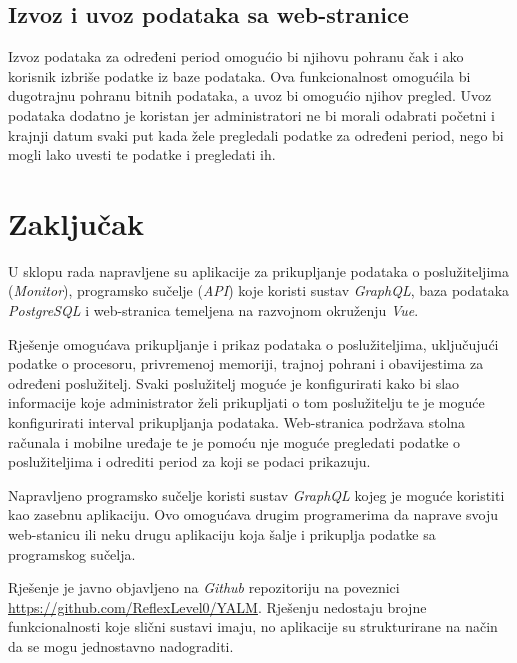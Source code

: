 \documentclass[zavrsnirad]{fer}
\begin{document}
\section{Izvoz i uvoz podataka sa web-stranice}
Izvoz podataka za određeni period omogućio bi njihovu pohranu čak i ako korisnik izbriše podatke iz baze podataka. Ova funkcionalnost omogućila bi dugotrajnu pohranu bitnih podataka, a uvoz bi omogućio njihov pregled. Uvoz podataka dodatno je koristan jer administratori ne bi morali odabrati početni i krajnji datum svaki put kada žele pregledali podatke za određeni period, nego bi mogli lako uvesti te podatke i pregledati ih.

\chapter{Zaključak}
U sklopu rada napravljene su aplikacije za prikupljanje podataka o poslužiteljima (\textit{Monitor}), programsko sučelje (\textit{API}) koje koristi sustav \textit{GraphQL}, baza podataka \textit{PostgreSQL} i web-stranica temeljena na razvojnom okruženju \textit{Vue}.

Rješenje omogućava prikupljanje i prikaz podataka o poslužiteljima, uključujući podatke o procesoru, privremenoj memoriji, trajnoj pohrani i obavijestima za određeni poslužitelj. Svaki poslužitelj moguće je konfigurirati kako bi slao informacije koje administrator želi prikupljati o tom poslužitelju te je moguće konfigurirati interval prikupljanja podataka. Web-stranica podržava stolna računala i mobilne uređaje te je pomoću nje moguće pregledati podatke o poslužiteljima i odrediti period za koji se podaci prikazuju.

Napravljeno programsko sučelje koristi sustav \textit{GraphQL} kojeg je moguće koristiti kao zasebnu aplikaciju. Ovo omogućava drugim programerima da naprave svoju web-stanicu ili neku drugu aplikaciju koja šalje i prikuplja podatke sa programskog sučelja.

Rješenje je javno objavljeno na \textit{Github} repozitoriju na poveznici \url{https://github.com/ReflexLevel0/YALM}. Rješenju nedostaju brojne funkcionalnosti koje slični sustavi imaju, no aplikacije su strukturirane na način da se mogu jednostavno nadograditi.

\end{document}
